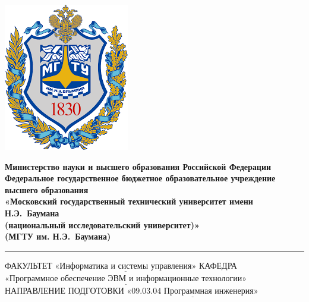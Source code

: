 \documentclass[letterpaper,12pt]{article}
\begin{document}
	
		\thispagestyle{empty}
		
		\noindent \begin{minipage}{0.15\textwidth}
			\includegraphics[width=\linewidth]{b_logo}
		\end{minipage}
		\noindent\begin{minipage}{0.9\textwidth}\centering
			\textbf{Министерство науки и высшего образования Российской Федерации}\\
			\textbf{Федеральное государственное бюджетное образовательное учреждение высшего образования}\\
			\textbf{«Московский государственный технический университет имени Н.Э.~Баумана}\\
			\textbf{(национальный исследовательский университет)»}\\
			\textbf{(МГТУ им. Н.Э.~Баумана)}
		\end{minipage}
		
		\noindent\rule{18cm}{3pt}
		\newline\newline
		\noindent ФАКУЛЬТЕТ $\underline{\text{«Информатика и системы управления»}}$ \newline\newline
		\noindent КАФЕДРА $\underline{\text{«Программное обеспечение ЭВМ и информационные технологии»}}$\newline\newline
		\noindent НАПРАВЛЕНИЕ ПОДГОТОВКИ $\underline{\text{«09.03.04 Программная инженерия»}}$\newline\newline\newline\newline\newline
		
\end{document}
